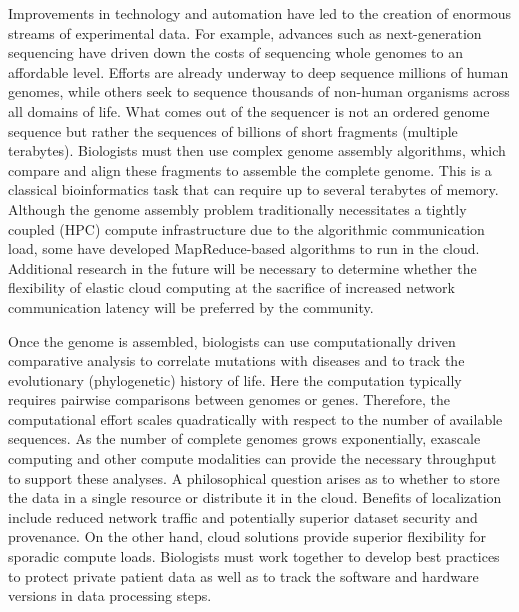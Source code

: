 \par Improvements in technology and automation have led to the creation of enormous streams of experimental data. For example, advances such as next-generation sequencing have driven down the costs of sequencing whole genomes to an affordable level. Efforts are already underway to deep sequence millions of human genomes\cite{Kaiser2016}, while others seek to sequence thousands of non-human organisms across all domains of life\cite{Pennisi2017,Normile2017}. What comes out of the sequencer is not an ordered genome sequence but rather the sequences of billions of short fragments (multiple terabytes). Biologists must then use complex genome assembly algorithms, which compare and align these fragments to assemble the complete genome. This is a classical bioinformatics task that can require up to several terabytes of memory\cite{Nystedt2013}. Although the genome assembly problem traditionally necessitates a tightly coupled (HPC) compute infrastructure due to the algorithmic communication load\cite{Spjuth2016}, some have developed MapReduce-based algorithms to run in the cloud\cite{ODriscoll2013}. Additional research in the future will be necessary to determine whether the flexibility of elastic cloud computing at the sacrifice of increased network communication latency will be preferred by the community.
\par Once the genome is assembled, biologists can use computationally driven comparative analysis to correlate mutations with diseases and to track the evolutionary (phylogenetic) history of life. Here the computation typically requires pairwise comparisons between genomes or genes. Therefore, the computational effort scales quadratically with respect to the number of available sequences. As the number of complete genomes grows exponentially, exascale computing and other compute modalities can provide the necessary throughput to support these analyses. A philosophical question arises as to whether to store the data in a single resource or distribute it in the cloud. Benefits of localization include reduced network traffic and potentially superior dataset security and provenance. On the other hand, cloud solutions provide superior flexibility for sporadic compute loads. Biologists must work together to develop best practices to protect private patient data as well as to track the software and hardware versions in data processing steps.
